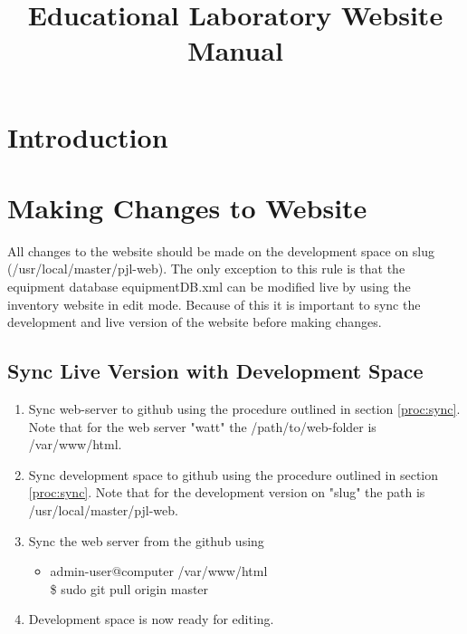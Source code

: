 \documentclass[justified]{book}
\begin{document}
\title{Educational Laboratory Website Manual}
\maketitle
\tableofcontents

\section{Introduction}





\section{Making Changes to Website}

All changes to the website should be made on the development space on slug (/usr/local/master/pjl-web). The only exception to this rule is that the equipment database equipmentDB.xml can be modified live by using the inventory website in edit mode. Because of this it is important to sync the development and live version of the website before making changes.

\subsection{Sync Live Version with Development Space}

\begin{enumerate}
\item Sync web-server to github using the procedure outlined in section \ref{proc:sync}. Note that for the web server "watt" the /path/to/web-folder is /var/www/html.

\item Sync development space to github using the procedure outlined in section \ref{proc:sync}. Note that for the development version on "slug" the path is /usr/local/master/pjl-web.

\item Sync the web server from the github using
\begin{itemize}
	\item admin-user@computer /var/www/html\\
	\$ sudo git pull origin master
\end{itemize}

\item Development space is now ready for editing.
\end{enumerate}
\end{document}
